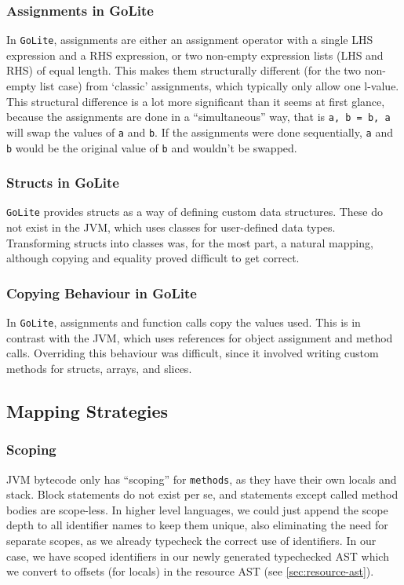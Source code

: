 \documentclass[11pt]{article}
\begin{document}
\subsubsection{Assignments in GoLite}
In \texttt{GoLite}, assignments are either an assignment operator with
a single LHS expression and a RHS expression, or two non-empty
expression lists (LHS and RHS) of equal length. This makes them
structurally different (for the two non-empty list case) from
`classic' assignments, which typically only allow one l-value.  This
structural difference is a lot more significant than it seems at first
glance, because the assignments are done in a ``simultaneous'' way,
that is \texttt{a, b = b, a} will swap the values of \texttt{a} and
\texttt{b}. If the assignments were done sequentially, \texttt{a} and
\texttt{b} would be the original value of \texttt{b} and wouldn't be
swapped.

\subsubsection{Structs in GoLite}
\texttt{GoLite} provides structs as a way of defining custom data structures.
These do not exist in the JVM, which uses classes for user-defined data types.
Transforming structs into classes was, for the most part, a natural mapping,
although copying and equality proved difficult to get correct.

\subsubsection{Copying Behaviour in GoLite}
In \texttt{GoLite}, assignments and function calls copy the values used.
This is in contrast with the JVM, which uses references for object assignment
and method calls. Overriding this behaviour was difficult, since it involved
writing custom methods for structs, arrays, and slices.

\subsection{Mapping Strategies}
\subsubsection{Scoping}
JVM bytecode only has ``scoping'' for \texttt{methods}, as they have
their own locals and stack. Block statements do not exist per se, and
statements except called method bodies are scope-less. In higher level
languages, we could just append the scope depth to all identifier
names to keep them unique, also eliminating the need for separate
scopes, as we already typecheck the correct use of identifiers. In our
case, we have scoped identifiers in our newly generated typechecked
AST which we convert to offsets (for locals) in the resource AST (see \ref{sec:resource-ast}).
\end{document}
